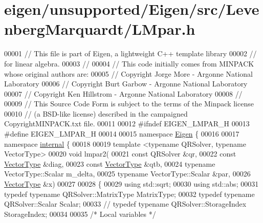 \hypertarget{eigen_2unsupported_2_eigen_2src_2_levenberg_marquardt_2_l_mpar_8h_source}{}\section{eigen/unsupported/\+Eigen/src/\+Levenberg\+Marquardt/\+L\+Mpar.h}
\label{eigen_2unsupported_2_eigen_2src_2_levenberg_marquardt_2_l_mpar_8h_source}

\begin{DoxyCode}
00001 \textcolor{comment}{// This file is part of Eigen, a lightweight C++ template library}
00002 \textcolor{comment}{// for linear algebra.}
00003 \textcolor{comment}{//}
00004 \textcolor{comment}{// This code initially comes from MINPACK whose original authors are:}
00005 \textcolor{comment}{// Copyright Jorge More - Argonne National Laboratory}
00006 \textcolor{comment}{// Copyright Burt Garbow - Argonne National Laboratory}
00007 \textcolor{comment}{// Copyright Ken Hillstrom - Argonne National Laboratory}
00008 \textcolor{comment}{//}
00009 \textcolor{comment}{// This Source Code Form is subject to the terms of the Minpack license}
00010 \textcolor{comment}{// (a BSD-like license) described in the campaigned CopyrightMINPACK.txt file.}
00011 
00012 \textcolor{preprocessor}{#ifndef EIGEN\_LMPAR\_H}
00013 \textcolor{preprocessor}{#define EIGEN\_LMPAR\_H}
00014 
00015 \textcolor{keyword}{namespace }\hyperlink{namespace_eigen}{Eigen} \{
00016 
00017 \textcolor{keyword}{namespace }\hyperlink{namespaceinternal}{internal} \{
00018   
00019   \textcolor{keyword}{template} <\textcolor{keyword}{typename} QRSolver, \textcolor{keyword}{typename} VectorType>
00020     \textcolor{keywordtype}{void} lmpar2(
00021     \textcolor{keyword}{const} QRSolver &qr,
00022     \textcolor{keyword}{const} \hyperlink{struct_vector_type}{VectorType}  &diag,
00023     \textcolor{keyword}{const} \hyperlink{struct_vector_type}{VectorType}  &qtb,
00024     \textcolor{keyword}{typename} VectorType::Scalar m\_delta,
00025     \textcolor{keyword}{typename} VectorType::Scalar &par,
00026     \hyperlink{struct_vector_type}{VectorType}  &x)
00027 
00028   \{
00029     \textcolor{keyword}{using} std::sqrt;
00030     \textcolor{keyword}{using} std::abs;
00031     \textcolor{keyword}{typedef} \textcolor{keyword}{typename} QRSolver::MatrixType MatrixType;
00032     \textcolor{keyword}{typedef} \textcolor{keyword}{typename} QRSolver::Scalar Scalar;
00033 \textcolor{comment}{//    typedef typename QRSolver::StorageIndex StorageIndex;}
00034 
00035     \textcolor{comment}{/* Local variables */}

\end{DoxyCode}
